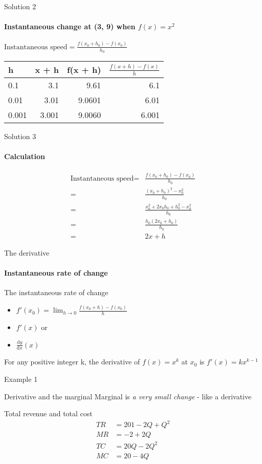 \documentclass[14pt,xcolor=pdftex,dvipsnames,table, handout]{beamer}
\begin{document}
\begin{frame}{Solution 2}
\framesubtitle{Instantaneous change at (3, 9) when $f(x) = x^2$}
$\text{Instantaneous speed} = \frac{f(x_0 + h_0) - f(x_0)}{h_0}$
\vskip 0.25cm
\begin{center}
\begin{tabular}{l r r r}
h & x + h & f(x + h) & $\frac{f(x +h) - f(x)}{h}$\\
\hline
0.1 & 3.1 & 9.61 & 6.1 \\
0.01 & 3.01 & 9.0601 & 6.01 \\
0.001 & 3.001 & 9.0060 & 6.001\\
\end{tabular}
\end{center}
\end{frame}

\begin{frame}{Solution 3}
\framesubtitle{Calculation}
\begin{align*}
\text{Instantaneous speed} = &\frac{f(x_0 + h_0) - f(x_0)}{h_0}\\
 = & \frac{(x_0 + h_0)^2 - x_0^2}{h_0}\\
 = & \frac{x_0^2 +2x_0h_0 + h_0^2 - x_0^2}{h_0}\\
 = & \frac{h_0(2x_0 + h_0)}{h_0}\\
 = & 2x + h
 \end{align*}
 \end{frame}
 
 \begin{frame}{The derivative}
 \framesubtitle{Instantaneous rate of change}
 The instantaneous rate of change 
 \pause
  \begin{itemize}[<+-| alert@+>]
 \item $f'(x_0) = \lim_{h \to 0} \frac{f(x_0 +h) - f(x_0)}{h}$
 \item $f'(x)$
 or
 \item $\frac{\mathrm d y}{\mathrm d x}(x)$
 \end{itemize}
 \pause
 \begin{block}{}
For any positive integer k, the derivative of $f(x) = x^k$ at $x_0$ is $f'(x) = kx^{k-1}$
\end{block}
\end{frame}

\begin{frame}{Example 1}
\begin{block}{Derivative and the marginal}
Marginal is \emph{a very small change} - like a derivative
\end{block}
\pause
\begin{block}{Total revenue and total cost}
\begin{align*}
TR &= 201 -2Q + Q^2\\
MR &= -2 + 2Q\\
TC &= 20Q -2Q^2\\
MC &= 20 -4Q
\end{align*}
\end{block}
\end{frame}
\end{document}
